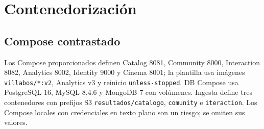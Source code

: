 \chapter{Contenedorización}\section{Compose contrastado}Los Compose proporcionados definen Catalog 8081, Community 8000, Interaction 8082, Analytics 8002, Identity 9000 y Cinema 8001; la plantilla usa imágenes \texttt{villabos/*:v2}, Analytics v3 y reinicio \texttt{unless-stopped}. DB Compose usa PostgreSQL 16, MySQL 8.4.6 y MongoDB 7 con volúmenes. Ingesta define tres contenedores con prefijos S3 \texttt{resultados/catalogo}, \texttt{comunity} e \texttt{iteraction}. Los Compose locales con credenciales en texto plano son un riesgo; se omiten sus valores.
